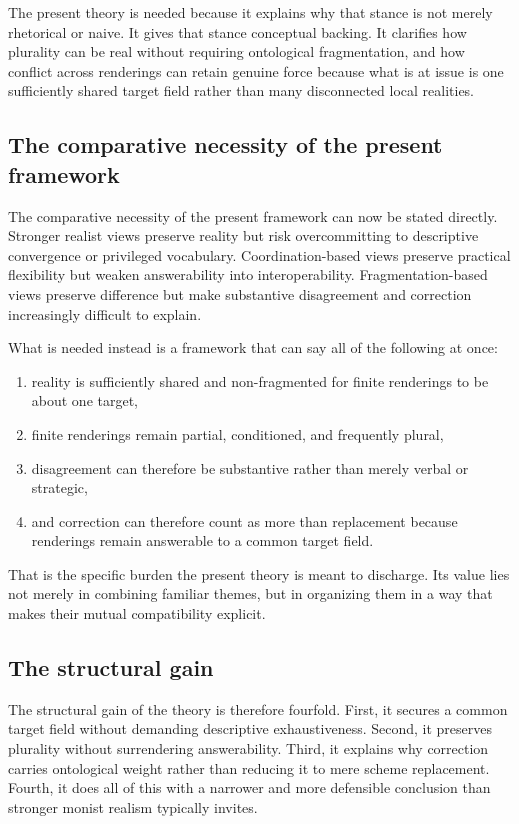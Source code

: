 \documentclass[11pt]{article}
\begin{document}
The present theory is needed because it explains why that stance is not merely rhetorical or naive. It gives that stance conceptual backing. It clarifies how plurality can be real without requiring ontological fragmentation, and how conflict across renderings can retain genuine force because what is at issue is one sufficiently shared target field rather than many disconnected local realities.

\subsection{The comparative necessity of the present framework}

The comparative necessity of the present framework can now be stated directly. Stronger realist views preserve reality but risk overcommitting to descriptive convergence or privileged vocabulary. Coordination-based views preserve practical flexibility but weaken answerability into interoperability. Fragmentation-based views preserve difference but make substantive disagreement and correction increasingly difficult to explain.

What is needed instead is a framework that can say all of the following at once:

\begin{enumerate}
    \item reality is sufficiently shared and non-fragmented for finite renderings to be about one target,
    \item finite renderings remain partial, conditioned, and frequently plural,
    \item disagreement can therefore be substantive rather than merely verbal or strategic,
    \item and correction can therefore count as more than replacement because renderings remain answerable to a common target field.
\end{enumerate}

That is the specific burden the present theory is meant to discharge. Its value lies not merely in combining familiar themes, but in organizing them in a way that makes their mutual compatibility explicit.

\subsection{The structural gain}

The structural gain of the theory is therefore fourfold. First, it secures a common target field without demanding descriptive exhaustiveness. Second, it preserves plurality without surrendering answerability. Third, it explains why correction carries ontological weight rather than reducing it to mere scheme replacement. Fourth, it does all of this with a narrower and more defensible conclusion than stronger monist realism typically invites.
\end{document}
